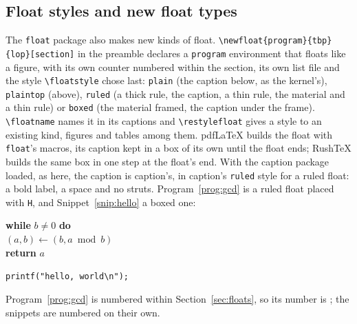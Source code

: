 \documentclass{article}
\numberwithin{equation}{section}
\theoremstyle{definition}
\theoremstyle{remark}
\begin{document}
\subsection{Float styles and new float types}\label{sec:newfloat}
The \texttt{float} package also makes new kinds of float. \verb|\newfloat{program}{tbp}{lop}[section]|
in the preamble declares a \texttt{program} environment that floats like a figure, with its
own counter numbered within the section, its own list file and the style
\verb|\floatstyle| chose last: \texttt{plain} (the caption below, as the kernel's),
\texttt{plaintop} (above), \texttt{ruled} (a thick rule, the caption, a thin rule, the
material and a thin rule) or \texttt{boxed} (the material framed, the caption under the
frame). \verb|\floatname| names it in its captions and \verb|\restylefloat| gives a style
to an existing kind, figures and tables among them. pdfLaTeX builds the float with
\texttt{float}'s macros, its caption kept in a box of its own until the float ends;
RushTeX builds the same box in one step at the float's end. With the caption package
loaded, as here, the caption is caption's, in caption's \texttt{ruled} style for a ruled
float: a bold label, a space and no struts. Program~\ref{prog:gcd} is a ruled float placed
with \texttt{H}, and Snippet~\ref{snip:hello} a boxed one:
\begin{program}[H]
  \caption{Euclid's algorithm for the greatest common divisor.}\label{prog:gcd}
  \noindent\textbf{while} $b \neq 0$ \textbf{do}\\
  \hspace*{1.5em}$(a, b) \gets (b, a \bmod b)$\\
  \textbf{return} $a$
\end{program}
\begin{snippet}
  \centering
  \verb|printf("hello, world\n");|
  \caption{The first program of many books.}\label{snip:hello}
\end{snippet}
Program~\ref{prog:gcd} is numbered within Section~\ref{sec:floats}, so its number is
\theprogram; the snippets are numbered on their own.
\end{document}
